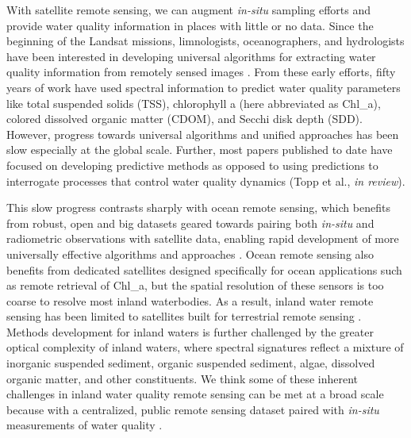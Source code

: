 \documentclass[draft,linenumbers]{agujournal2018}
\begin{document}
With satellite remote sensing, we can augment \emph{in-situ} sampling
efforts and provide water quality information in places with little or
no data. Since the beginning of the Landsat missions, limnologists,
oceanographers, and hydrologists have been interested in developing
universal algorithms for extracting water quality information from
remotely sensed images
\citep{Clarke1970,Klemas1973,Maul1975,Ritchie1976,Holyer1978}. From
these early efforts, fifty years of work have used spectral information
to predict water quality parameters like total suspended solids (TSS),
chlorophyll a (here abbreviated as Chl\_a), colored dissolved organic
matter (CDOM), and Secchi disk depth (SDD). However, progress towards
universal algorithms and unified approaches has been slow
\citep{Bukata2013,Blondeau-Patissier2014,Palmer2015,Gholizadeh2016}
especially at the global scale. Further, most papers published to date
have focused on developing predictive methods as opposed to using
predictions to interrogate processes that control water quality dynamics
(Topp et al., \emph{in review}).

This slow progress contrasts sharply with ocean remote sensing, which
benefits from robust, open and big datasets geared towards pairing both
\emph{in-situ} and radiometric observations with satellite data,
enabling rapid development of more universally effective algorithms and
approaches \citep{Blondeau-Patissier2014,Bukata2013}. Ocean remote
sensing also benefits from dedicated satellites designed specifically
for ocean applications such as remote retrieval of Chl\_a, but the
spatial resolution of these sensors is too coarse to resolve most inland
waterbodies. As a result, inland water remote sensing has been limited
to satellites built for terrestrial remote sensing \citep{Palmer2015}.
Methods development for inland waters is further challenged by the
greater optical complexity of inland waters, where spectral signatures
reflect a mixture of inorganic suspended sediment, organic suspended
sediment, algae, dissolved organic matter, and other constituents. We
think some of these inherent challenges in inland water quality remote
sensing can be met at a broad scale because with a centralized, public
remote sensing dataset paired with \emph{in-situ} measurements of water
quality \citep{Palmer2015}.
\end{document}
